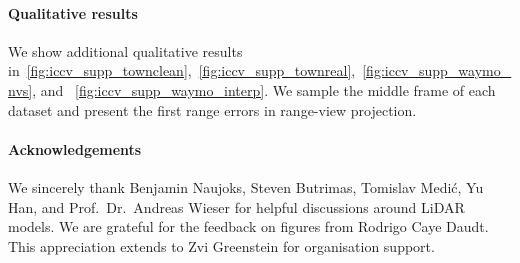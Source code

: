 \paragraph{Qualitative results}
We show additional qualitative results in~\cref{fig:iccv_supp_townclean},~\cref{fig:iccv_supp_townreal},~\cref{fig:iccv_supp_waymo_nvs}, and ~\cref{fig:iccv_supp_waymo_interp}. We sample the middle frame of each dataset and present the first range errors in range-view projection. 

\paragraph{Acknowledgements}
{We sincerely thank Benjamin Naujoks, Steven Butrimas, Tomislav Medić, Yu Han, and Prof.~Dr.~Andreas Wieser for helpful discussions around LiDAR models. We are grateful for the feedback on figures from Rodrigo Caye Daudt. This appreciation extends to Zvi Greenstein for organisation support.}

\clearpage









